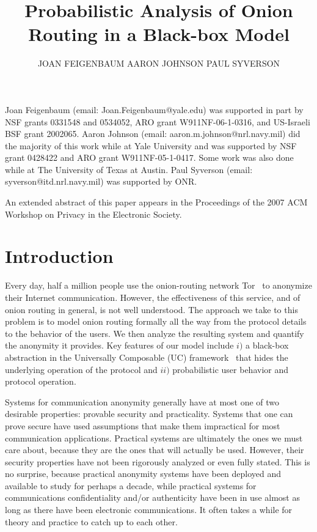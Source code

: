 \documentclass[prodmode,acmtissec]{acmsmall}
\title{Probabilistic Analysis of Onion Routing in a Black-box Model}
\author{JOAN FEIGENBAUM \affil{Yale University} AARON JOHNSON
  \affil{U.S. Naval Research Laboratory} PAUL SYVERSON \affil{U.S. Naval
    Research Laboratory}
}
\begin{document}
\begin{bottomstuff}
Joan Feigenbaum (email: Joan.Feigenbaum@yale.edu) was supported in part by NSF grants 0331548 and 0534052, ARO grant W911NF-06-1-0316, and US-Israeli BSF grant 2002065.
Aaron Johnson (email: aaron.m.johnson@nrl.navy.mil) did the majority of this work while at Yale University and was supported by NSF grant 0428422 and ARO grant W911NF-05-1-0417. Some work was also done while at The University of Texas at Austin. 
Paul Syverson (email: syverson@itd.nrl.navy.mil) was supported by ONR.

An extended abstract of this paper appears in the Proceedings of the 2007 ACM Workshop on Privacy in the Electronic Society.
\end{bottomstuff}
\maketitle

\section{Introduction}
Every day, half a million people use the onion-routing network Tor~\cite{tor-design} to anonymize their Internet communication.  However, the effectiveness of this service, and of onion routing in general, is not well understood.  The approach we take to this problem is to model onion routing formally all the way from the protocol details to the behavior of the users.  We then analyze the resulting system and quantify the anonymity it provides.  Key features of our model include $i)$ a black-box abstraction in the Universally Composable (UC) framework~\cite{cryptoeprint:2000:067} that hides the underlying operation of the protocol and $ii)$ probabilistic user behavior and protocol operation.


Systems for communication anonymity generally have at most one of two desirable properties: provable security and practicality.  Systems that one can prove secure have used assumptions that make them impractical for most communication applications.  Practical systems are ultimately the ones we must care about, because they are the ones that will actually be used. However, their security properties have not been rigorously analyzed or even fully stated. This is no surprise, because practical anonymity systems have been deployed and available to study for perhaps a decade, while practical systems for communications confidentiality and/or authenticity have been in use almost as long as there have been electronic communications. It often takes a while for theory and practice to catch up to each other.
\end{document}
